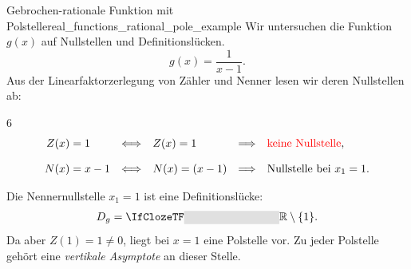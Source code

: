 \begin{ExampleBox}{Gebrochen-rationale Funktion mit Polstelle}{real_functions_rational_pole_example}
  Wir untersuchen die Funktion $g(x)$ auf Nullstellen und Definitionslücken.
  \[
    g(x)=\frac{1}{x-1}.
  \]
  Aus der Linearfaktorzerlegung von Zähler und Nenner lesen wir deren Nullstellen ab:
  \begin{ClozeArea}[32]{6}
    \[
      \begin{alignedat}{3}
        Z(x)&=1
          &\quad\Longleftrightarrow\quad& Z(x)=1
          &\quad\Longrightarrow\quad& \textcolor{red}{\text{keine Nullstelle}},\\[0.8em]
        N(x)&=x-1
          &\quad\Longleftrightarrow\quad& N(x)=(x-1)
          &\quad\Longrightarrow\quad& \text{Nullstelle bei }x_1=1.
      \end{alignedat}
    \]
  \end{ClozeArea}
  \noindent
  \begin{minipage}[c]{0.45\linewidth}
    Die Nennernullstelle $x_1=1$ ist eine Definitionslücke:
    \[
      D_g=\Cloze{3cm}{\R\setminus\{1\}}.
    \]
    Da aber $Z(1)=1 \neq 0$, liegt bei $x=1$ eine Polstelle vor.
    Zu jeder Polstelle gehört eine \textcolor{green!55!black}{\emph{vertikale Asymptote}}
     an dieser Stelle.
  \end{minipage}\hfill
  \begin{minipage}[c]{0.52\linewidth}
    \centering
  \end{minipage}
\end{ExampleBox}

